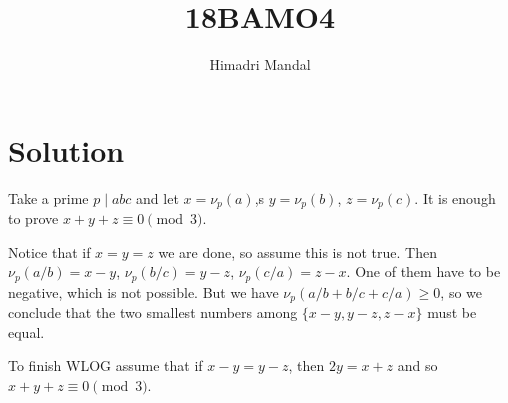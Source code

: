 \documentclass[11pt]{scrartcl}
\title{18BAMO4}
\author{Himadri Mandal}
\begin{document}
\maketitle

\section{Solution}
\raggedright
\begin{soln}
	
Take a prime $p \mid abc$ and let $x = \nu_p(a)$,s
$y = \nu_p(b)$, $z = \nu_p(c)$.
It is enough to prove $x+y+z \equiv 0 \pmod{3}$.

Notice that if $x=y=z$ we are done, so assume this is not true. Then $\nu_p(a/b) = x-y$, $\nu_p(b/c) = y-z$, $\nu_p(c/a) = z-x$. One of them have to be negative, which is not possible. But we have $\nu_p(a/b+b/c+c/a) \ge 0$, so we conclude that the two smallest numbers among $\{x-y, y-z, z-x\}$ must be equal.

To finish WLOG assume that if $x-y = y-z$, then $2y = x+z$ and so $x+y+z \equiv 0 \pmod 3$.

\end{soln}
\end{document}
